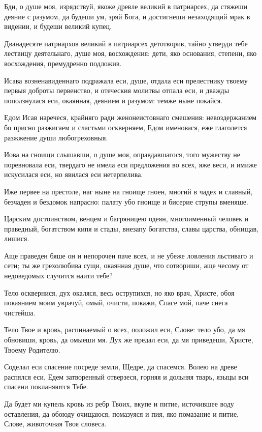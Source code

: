 Бди, о душе моя, изрядствуй, якоже древле великий в патриарсех, да стяжеши деяние с разумом, да будеши ум, зряй Бога, и достигнеши незаходящий мрак в видении, и будеши великий купец.


Дванадесяте патриархов великий в патриарсех детотворив, тайно утверди тебе лествицу деятельнаго, душе моя, восхождения: дети, яко основания, степени, яко восхождения, премудренно подложив.


Исава возненавиденнаго подражала еси, душе, отдала еси прелестнику твоему первыя доброты первенство, и отеческия молитвы отпала еси, и дважды поползнулася еси, окаянная, деянием и разумом: темже ныне покайся.


Едом Исав наречеся, крайняго ради женонеистовнаго смешения: невоздержанием бо присно разжигаем и сластьми оскверняем, Едом именовася, еже глаголется разжжение души любогреховныя.


Иова на гноищи слышавши, о душе моя, оправдавшагося, того мужеству не поревновала еси, твердаго не имела еси предложения во всех, яже веси, и имиже искусилася еси, но явилася еси нетерпелива.


Иже первее на престоле, наг ныне на гноище гноен, многий в чадех и славный, безчаден и бездомок напрасно: палату убо гноище и бисерие струпы вменяше.


Царским достоинством, венцем и багряницею одеян, многоименный человек и праведный, богатством кипя и стады, внезапу богатства, славы царства, обнищав, лишися.


Аще праведен бяше он и непорочен паче всех, и не убеже ловления льстиваго и сети; ты же грехолюбива сущи, окаянная душе, что сотвориши, аще чесому от недоведомых случится наити тебе?


Тело осквернися, дух окаляся, весь острупихся, но яко врач, Христе, обоя покаянием моим уврачуй, омый, очисти, покажи, Спасе мой, паче снега чистейша.


Тело Твое и кровь, распинаемый о всех, положил еси, Слове: тело убо, да мя обновиши, кровь, да омыеши мя. Дух же предал еси, да мя приведеши, Христе, Твоему Родителю.


Соделал еси спасение посреде земли, Щедре, да спасемся. Волею на древе распялся еси, Едем затворенный отверзеся, горняя и дольняя тварь, языцы вси спасени покланяются Тебе.


Да будет ми купель кровь из ребр Твоих, вкупе и питие, источившее воду оставления, да обоюду очищаюся, помазуяся и пия, яко помазание и питие, Слове, животочная Твоя словеса.


